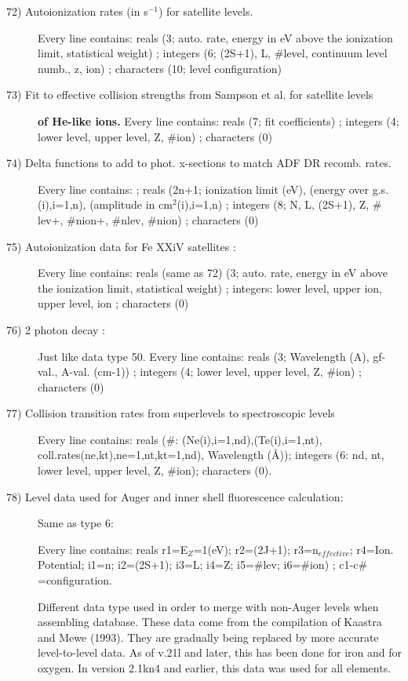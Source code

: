 \begin{description}
\item[72) Autoionization rates (in s$^{-1}$) for satellite levels.]
 Every line contains:
 reals (3; auto. rate, energy in eV above the ionization limit, 
            statistical weight)
; integers (6; (2S+1), L, $\#$level, continuum level numb., z, ion)
; characters (10; level configuration)

\item[73) Fit to effective collision strengths from Sampson et al. for satellite levels] 
{\bf of He-like ions.}
 Every line contains:
 reals (7; fit coefficients)
; integers (4; lower level, upper level, Z, $\#$ion)
; characters (0)

\item[74) Delta functions to add to phot. x-sections to match ADF DR recomb. rates.]
 Every line  contains:
; reals (2n+1; ionization limit (eV), (energy over g.s.(i),i=1,n),
        (amplitude in cm$^2$(i),i=1,n)
; integers (8; N, L, (2S+1), Z, $\#$lev+, $\#$nion+, $\#$nlev, $\#$nion)
; characters (0)

\item[75) Autoionization data for Fe XXiV satellites  :]

 Every line contains:
 reals (same as 72) (3; auto. rate, energy in eV above the ionization limit, 
            statistical weight)
; integers: lower level, upper ion, upper level, ion
; characters (0)

\item[76) 2 photon decay :]
 
Just like data type 50.
Every line  contains:
 reals (3; Wavelength (A), gf-val., A-val. (cm-1))
; integers (4; lower level, upper level, Z, $\#$ion)
; characters (0)

\item[77) Collision transition rates from superlevels to spectroscopic levels] 

Every line contains: reals ($\#$: (Ne(i),i=1,nd),(Te(i),i=1,nt),
coll.rates(ne,kt),ne=1,nt,kt=1,nd), Wavelength (\AA)); integers (6: nd,
nt, lower level, upper level, Z, $\#$ion); characters (0).

\item[78) Level data used for Auger and inner shell fluorescence 
calculation:]  Same as type 6:
 
Every line  contains:
 reals r1=E$_Z$=1(eV); r2=(2J+1); r3=n$_{effective}$; r4=Ion. Potential;
i1=n; i2=(2S+1); i3=L; i4=Z; i5=$\#$lev; i6=$\#$ion)
; c1-c$\#$=configuration.

Different data type used in order 
to merge with non-Auger levels when assembling database.  These data 
come from the compilation of Kaastra and Mewe (1993).  They are 
gradually being replaced by more accurate level-to-level data.
As of v.21l and later, this has been done for iron and for oxygen.
In version 2.1kn4 and earlier, this data was used for all elements.


\end{description}
